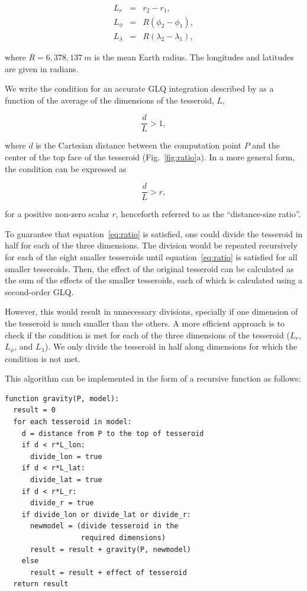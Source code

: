 \begin{eqnarray}
    L_r &=& r_2 - r_1,\\
    L_\phi &=& R(\phi_2 - \phi_1),\\
    L_\lambda &=& R(\lambda_2 - \lambda_1),
\end{eqnarray}

\noindent
where $R=6,378,137\ m$ is the mean Earth radius.
The longitudes and latitudes are given in radians.

We write the condition for an accurate GLQ integration
described by \citet{Ku1977}
as a function of
the average of the dimensions of the tesseroid, $L$,

\begin{equation}
    \frac{d}{L} > 1,
\end{equation}

\noindent
where $d$ is the Cartesian distance
between the computation point $P$
and the center of the top face of the tesseroid
(Fig.~\ref{fig:ratio}a).
In a more general form, the condition can be expressed as

\begin{equation}
    \frac{d}{L} > r,
    \label{eq:ratio}
\end{equation}

\noindent
for a positive non-zero scalar $r$,
henceforth referred to as
the ``distance-size ratio''.

To guarantee that equation~\ref{eq:ratio} is satisfied,
one could divide the tesseroid in half for each of the three dimensions.
The division would be repeated recursively
for each of the eight smaller tesseroids
until equation~\ref{eq:ratio} is satisfied for all smaller tesseroids.
Then, the effect of the original tesseroid can be calculated
as the sum of the
effects of the smaller tesseroids,
each of which is calculated using a second-order GLQ.

However, this would result in unnecessary divisions,
specially if one dimension of the tesseroid is much smaller than the others.
A more efficient approach is to check if the condition is met for each of the
three dimensions of the tesseroid ($L_r$, $L_\phi$, and $L_\lambda$).
We only divide the tesseroid in half along dimensions for which the condition
is not met.

This algorithm can be implemented
in the form of a recursive function
as follows:

\begin{verbatim}
function gravity(P, model):
  result = 0
  for each tesseroid in model:
    d = distance from P to the top of tesseroid
    if d < r*L_lon:
      divide_lon = true
    if d < r*L_lat:
      divide_lat = true
    if d < r*L_r:
      divide_r = true
    if divide_lon or divide_lat or divide_r:
      newmodel = (divide tesseroid in the
                  required dimensions)
      result = result + gravity(P, newmodel)
    else
      result = result + effect of tesseroid
  return result
\end{verbatim}

